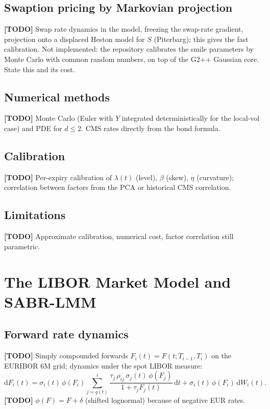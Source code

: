 \documentclass[11pt,a4paper]{article}
\theoremstyle{plain}
\theoremstyle{definition}
\newcommand{\dd}{\mathrm{d}}
\newcommand{\todo}[1]{\textcolor{red!70!black}{\textbf{[TODO]} #1}}
\begin{document}
\subsection{Swaption pricing by Markovian projection}
\todo{Swap rate dynamics in the model, freezing the swap-rate gradient, projection onto a displaced Heston model for $S$ (Piterbarg); this gives the fast calibration. Not implemented: the repository calibrates the smile parameters by Monte Carlo with common random numbers, on top of the G2++ Gaussian core. State this and its cost.}

\subsection{Numerical methods}
\todo{Monte Carlo (Euler with $Y$ integrated deterministically for the local-vol case) and PDE for $d\leq2$. CMS rates directly from the bond formula.}

\subsection{Calibration}
\todo{Per-expiry calibration of $\lambda(t)$ (level), $\beta$ (skew), $\eta$ (curvature); correlation between factors from the PCA or historical CMS correlation.}

\subsection{Limitations}
\todo{Approximate calibration, numerical cost, factor correlation still parametric.}

\clearpage
\section{The LIBOR Market Model and SABR-LMM}
\label{sec:lmm}

\subsection{Forward rate dynamics}
\todo{Simply compounded forwards $F_i(t)=F(t;T_{i-1},T_i)$ on the EURIBOR 6M grid; dynamics under the spot LIBOR measure:}
\begin{equation}
    \dd F_i(t) = \sigma_i(t)\,\phi(F_i)\sum_{j=q(t)}^{i}\frac{\tau_j\,\rho_{ij}\,\sigma_j(t)\,\phi(F_j)}{1+\tau_jF_j(t)}\,\dd t + \sigma_i(t)\,\phi(F_i)\,\dd W_i(t).
\end{equation}
\todo{$\phi(F)=F+\delta$ (shifted lognormal) because of negative EUR rates.}
\end{document}
